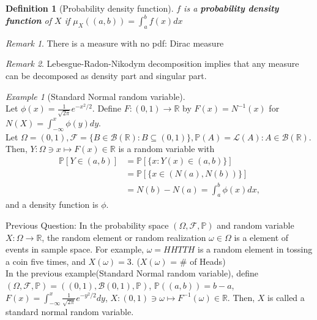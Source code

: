 \documentclass[12pt]{report}
\renewcommand{\1}{\mathbb{1}}
\renewcommand{\subset}{\subseteq}
\theoremstyle{break}
\theoremstyle{newdef}
\newtheorem{defn}[thm]{Definition} %
\theoremstyle{remark}
\newtheorem*{exmp}{Example} %
\newtheorem*{rem}{Remark} %
\begin{document}
\begin{defn}[Probability density function]
$f$ is a \textbf{probability density function} of $X$ if $\mu_X((a,b)) = \int_a^b f(x)dx$
\end{defn}

\begin{rem}
There is a measure with no pdf: Dirac measure
\end{rem}

\begin{rem}
Lebesgue-Radon-Nikodym decomposition implies that any measure can be decomposed as density part and singular part.
\end{rem}

\begin{exmp}[Standard Normal random variable]
\leavevmode\\
Let $\phi(x) = \frac{1}{\sqrt{2\pi}} e^{-x^2/2}$.
Define $F : (0,1) \rightarrow \mathbb{R}$ by $F(x) = N^{-1}(x)$ for $N(X) = \int_{-\infty}^x \phi(y)dy$.\\
Let $\Omega = (0,1), \mathcal{F} = \{B \in \mathcal{B}(\mathbb{R}) : B \subset (0,1)\}, \mathbb{P}(A) = \mathcal{L}(A) : A \in \mathcal{B}(\mathbb{R})$.\\
Then, $Y : \Omega \ni x \mapsto F(x) \in \mathbb{R}$ is a random variable with
$$
\begin{aligned}
\mathbb{P}[Y \in (a,b)]
&= \mathbb{P}[\{x : Y(x) \in (a,b)\}]\\
&= \mathbb{P}[\{x \in (N(a),N(b))\}]\\
&= N(b)-N(a) = \int_a^b \phi(x)dx,
\end{aligned}
$$
and a density function is $\phi$.
\end{exmp}


\vspace{5mm}
Previous Question: In the probability space $(\Omega, \mathcal{F}, \mathbb{P})$ and random variable $X : \Omega \rightarrow \mathbb{R}$, the random element or random realization $\omega \in \Omega$ is a element of events in sample space.
For example, $\omega = HHTTH$ is a random element in tossing a coin five times, and $X(\omega) = 3$. ($X(\omega)$ = \# of Heads)\\
In the previous example(Standard Normal random variable), define $(\Omega, \mathcal{F}, \mathbb{P}) = ((0,1), \mathcal{B}(0,1), \mathbb{P})$, $\mathbb{P}((a,b)) = b-a$, $F(x) = \int_{-\infty}^x \frac{1}{\sqrt{2\pi}}e^{-y^2/2}dy$, $X : (0,1) \ni \omega \mapsto F^{-1}(\omega) \in \mathbb{R}$.
Then, $X$ is called a standard normal random variable.
\end{document}
